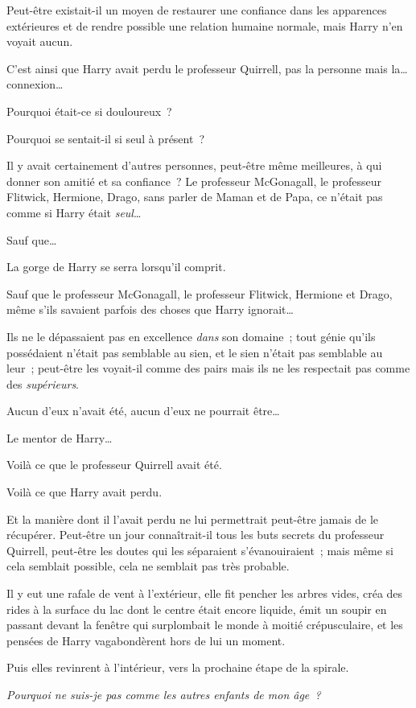 Peut-être existait-il un moyen de restaurer une confiance dans les apparences extérieures et de rendre possible une relation humaine normale, mais Harry n'en voyait aucun.

C'est ainsi que Harry avait perdu le professeur Quirrell, pas la personne mais la… connexion…

Pourquoi était-ce si douloureux~?

Pourquoi se sentait-il si seul à présent~?

Il y avait certainement d'autres personnes, peut-être même meilleures, à qui donner son amitié et sa confiance~? Le professeur McGonagall, le professeur Flitwick, Hermione, Drago, sans parler de Maman et de Papa, ce n'était pas comme si Harry était \emph{seul}…

Sauf que…

La gorge de Harry se serra lorsqu'il comprit.

Sauf que le professeur McGonagall, le professeur Flitwick, Hermione et Drago, même s'ils savaient parfois des choses que Harry ignorait…

Ils ne le dépassaient pas en excellence \emph{dans} son domaine~; tout génie qu'ils possédaient n'était pas semblable au sien, et le sien n'était pas semblable au leur~; peut-être les voyait-il comme des pairs mais ils ne les respectait pas comme des \emph{supérieurs}.

Aucun d'eux n'avait été, aucun d'eux ne pourrait être…

Le mentor de Harry…

Voilà ce que le professeur Quirrell avait été.

Voilà ce que Harry avait perdu.

Et la manière dont il l'avait perdu ne lui permettrait peut-être jamais de le récupérer. Peut-être un jour connaîtrait-il tous les buts secrets du professeur Quirrell, peut-être les doutes qui les séparaient s'évanouiraient~; mais même si cela semblait possible, cela ne semblait pas très probable.

Il y eut une rafale de vent à l'extérieur, elle fit pencher les arbres vides, créa des rides à la surface du lac dont le centre était encore liquide, émit un soupir en passant devant la fenêtre qui surplombait le monde à moitié crépusculaire, et les pensées de Harry vagabondèrent hors de lui un moment.

Puis elles revinrent à l'intérieur, vers la prochaine étape de la spirale.

\emph{Pourquoi ne suis-je pas comme les autres enfants de mon âge~?}

